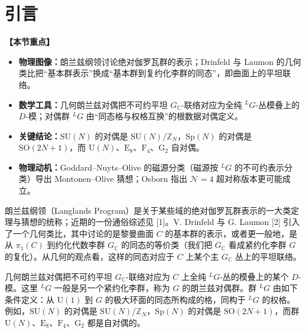 \documentclass[11pt,a4paper,UTF8]{ctexart}
\newenvironment{keypoints}{%
  \par\addvspace{0.9em}%
  \noindent{\color{black!80}\rule{\linewidth}{0.6pt}}\par\nopagebreak\vspace{2pt}%
  \noindent\textbf{【本节重点】}\par\nopagebreak\vspace{2pt}%
  \begin{itemize}[leftmargin=1.6em,itemsep=1pt,topsep=2pt,parsep=0pt]%
}{%
  \end{itemize}\vspace{1pt}\noindent{\color{black!80}\rule{\linewidth}{0.6pt}}\par\addvspace{0.9em}%
}
\begin{document}
\section{引言}

\begin{keypoints}
    \item \textbf{物理图像：}朗兰兹纲领讨论绝对伽罗瓦群的表示；Drinfeld 与 Laumon 的几何类比把“基本群表示”换成“基本群到复约化李群的同态”，即曲面上的平坦联络。
    \item \textbf{数学工具：}几何朗兰兹对偶把不可约平坦 $G_{\mathbb{C}}$-联络对应为全纯 ${}^{L}G$-丛模叠上的 $D$-模；对偶群 ${}^{L}G$ 由“同态格与权格互换”的根数据对偶定义。
    \item \textbf{关键结论：}$\mathrm{SU}(N)$ 的对偶是 $\mathrm{SU}(N)/\mathbb{Z}_{N}$，$\mathrm{Sp}(N)$ 的对偶是 $\mathrm{SO}(2N+1)$，而 $\mathrm{U}(N)$、$\mathrm{E}_{8}$、$\mathrm{F}_{4}$、$\mathrm{G}_{2}$ 自对偶。
    \item \textbf{物理动机：}Goddard–Nuyts–Olive 的磁源分类（磁源按 ${}^{L}G$ 的不可约表示分类）导出 Montonen–Olive 猜想；Osborn 指出 $\mathcal{N}=4$ 超对称版本更可能成立。
\end{keypoints}

朗兰兹纲领（Langlands Program）是关于某些域的绝对伽罗瓦群表示的一大类定理与猜想的统称；近期的一份通俗综述见 [1]。V. Drinfeld 与 G. Laumon [2] 引入了一个几何类比，其中讨论的是黎曼曲面 $C$ 的基本群的表示，或者更一般地，是从 $\pi_{1}(C)$ 到约化代数李群 $G_{\mathbb{C}}$ 的同态的等价类（我们把 $G_{\mathbb{C}}$ 看成紧约化李群 $G$ 的复化）。从几何的观点看，这样的同态对应于 $C$ 上某个主 $G_{\mathbb{C}}$ 丛上的平坦联络。


几何朗兰兹对偶把不可约平坦 $G_{\mathbb{C}}$-联络对应为 $C$ 上全纯 ${}^{L}G$-丛的模叠上的某个 $D$-模。这里 ${}^{L}G$ 一般是另一个紧约化李群，称为 $G$ 的朗兰兹对偶群。群 ${}^{L}G$ 由如下条件定义：从 $\mathrm{U}(1)$ 到 $G$ 的极大环面的同态所构成的格，同构于 ${}^{L}G$ 的权格。例如，$\mathrm{SU}(N)$ 的对偶是 $\mathrm{SU}(N)/\mathbb{Z}_{N}$，$\mathrm{Sp}(N)$ 的对偶是 $\mathrm{SO}(2N+1)$，而群 $\mathrm{U}(N)$、$\mathrm{E}_{8}$、$\mathrm{F}_{4}$、$\mathrm{G}_{2}$ 都是自对偶的。
\end{document}
